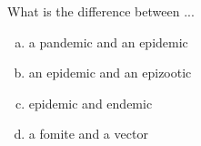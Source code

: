 
What is the difference between ...
\begin{enumerate}[(a)]
\item a pandemic and an epidemic
\answerSpace{.7in}
\item an epidemic and an epizootic
\answerSpace{.7in}
\item epidemic and endemic
\answerSpace{.7in}
\item a fomite and a vector
\answerSpace{.7in}
\end{enumerate}